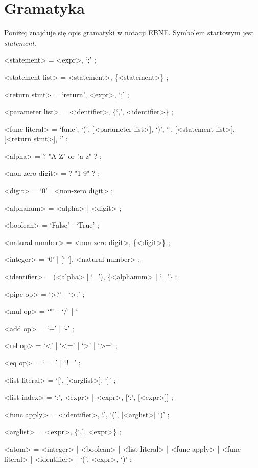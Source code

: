 \documentclass{article}
\begin{document}
\section{Gramatyka}
	Poniżej znajduje się opis gramatyki w notacji EBNF. Symbolem startowym jest \textit{statement}.

	\renewcommand{\syntleft}{\normalfont\itshape}
	\renewcommand{\syntright}{}

	\begin{grammar}
		<statement> = <expr>, `;' ;

		<statement list> = <statement>, \{<statement>\} ;

		<return stmt> = `return', <expr>, `;' ;

		<parameter list> = <identifier>, \{`,', <identifier>\} ;

		<func literal> = `func', `(', [<parameter list>], `)',
						`{', [<statement list>], [<return stmt>], `}' ;
	\end{grammar}
	\begin{grammar}
		<alpha> = ? "A-Z" or "a-z" ? ;

		<non-zero digit> = ? "1-9" ? ;

		<digit> = `0' | <non-zero digit> ;

		<alphanum> = <alpha> | <digit> ;

		<boolean> = `False' | `True' ;

		<natural number> = <non-zero digit>, \{<digit>\} ;

		<integer> = `0' | [`-'], <natural number> ;

		<identifier> = (<alpha> | `_'), \{<alphanum> | `_'\} ;

		<pipe op> = `>?' | `>:' ;

		<mul op> = `*' | `/' | `%

		<add op> = `+' | `-' ;

		<rel op> = `<' | `<=' | `>' | `>=' ;

		<eq op> = `==' | `!=' ;
	\end{grammar}
	\begin{grammar}
		<list literal> = `[', [<arglist>], `]' ;

		<list index> = `:', <expr> | <expr>, [`:', [<expr>]] ;

		<func apply> = <identifier>, `.', `(', [<arglist>] `)' ;

		<arglist> = <expr>, \{`,', <expr>\} ;

		<atom> = <integer> | <boolean> | <list literal>
				 | <func apply> | <func literal> | <identifier> | `(', <expr>, `)' ;
	\end{grammar}
\end{document}
